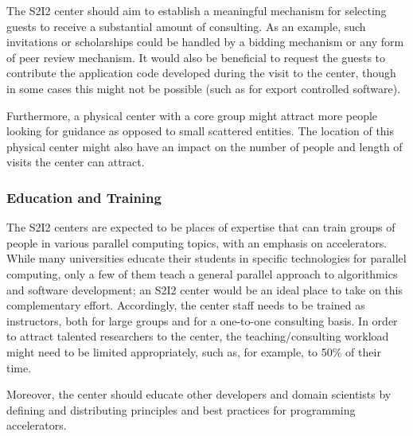 The S2I2 center should aim to establish a meaningful mechanism for selecting guests to receive a substantial amount of consulting. As an example, such invitations or scholarships could be handled by a bidding mechanism or any form of peer review mechanism. It would also be beneficial to request the guests to contribute the application code developed during the visit to the center, though in some cases this might not be possible (such as for export controlled software).

Furthermore, a physical center with a core group might attract more people looking for guidance as opposed to small scattered entities. The location of this physical center might also have an impact on the number of people and length of visits the center can attract.

\subsubsection{Education and Training}
The S2I2 centers are expected to be places of expertise that can train groups of people in various parallel computing topics, with an emphasis on accelerators. While many universities educate their students in specific technologies for parallel computing, only a few of them teach a general parallel approach to algorithmics and software development; an S2I2 center would be an ideal place to take on this complementary effort. Accordingly, the center staff needs to be trained as instructors, both for large groups and for a one-to-one consulting basis. In order to attract talented researchers to the center, the teaching/consulting workload might need to be limited appropriately, such as, for example, to 50\% of their time.

Moreover, the center should educate other developers and domain scientists by defining and distributing principles and best practices for programming accelerators.
